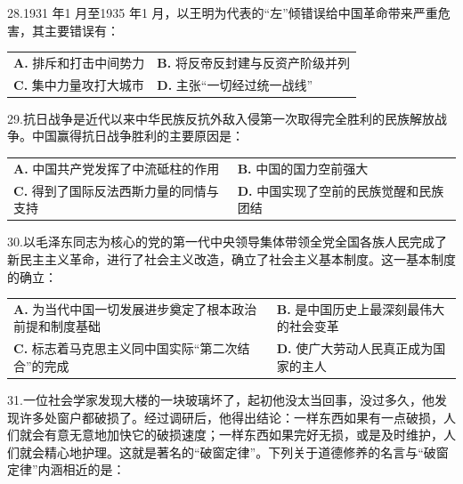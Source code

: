 \documentclass[UTF8,11pt]{ctexart}
\begin{document}
28.1931 年1 月至1935 年1 月，以王明为代表的“左”倾错误给中国革命带来严重危害，其主要错误有：


\begin{center}\begin{tabular}{>{\raggedright\arraybackslash}p{\dimexpr(\linewidth-4\tabcolsep)/2\relax}>{\raggedright\arraybackslash}p{\dimexpr(\linewidth-4\tabcolsep)/2\relax}}
\textbf{A.} 排斥和打击中间势力 & \textbf{B.} 将反帝反封建与反资产阶级并列\\[.35em]
\textbf{C.} 集中力量攻打大城市 & \textbf{D.} 主张“一切经过统一战线”\\[.35em]\end{tabular}\end{center}

29.抗日战争是近代以来中华民族反抗外敌入侵第一次取得完全胜利的民族解放战争。中国赢得抗日战争胜利的主要原因是：


\begin{center}\begin{tabular}{>{\raggedright\arraybackslash}p{\dimexpr(\linewidth-4\tabcolsep)/2\relax}>{\raggedright\arraybackslash}p{\dimexpr(\linewidth-4\tabcolsep)/2\relax}}
\textbf{A.} 中国共产党发挥了中流砥柱的作用 & \textbf{B.} 中国的国力空前强大\\[.35em]
\textbf{C.} 得到了国际反法西斯力量的同情与支持 & \textbf{D.} 中国实现了空前的民族觉醒和民族团结\\[.35em]\end{tabular}\end{center}

30.以毛泽东同志为核心的党的第一代中央领导集体带领全党全国各族人民完成了新民主主义革命，进行了社会主义改造，确立了社会主义基本制度。这一基本制度的确立：


\begin{center}\begin{tabular}{>{\raggedright\arraybackslash}p{\dimexpr(\linewidth-4\tabcolsep)/2\relax}>{\raggedright\arraybackslash}p{\dimexpr(\linewidth-4\tabcolsep)/2\relax}}
\textbf{A.} 为当代中国一切发展进步奠定了根本政治前提和制度基础 & \textbf{B.} 是中国历史上最深刻最伟大的社会变革\\[.35em]
\textbf{C.} 标志着马克思主义同中国实际“第二次结合”的完成 & \textbf{D.} 使广大劳动人民真正成为国家的主人\\[.35em]\end{tabular}\end{center}

31.一位社会学家发现大楼的一块玻璃坏了，起初他没太当回事，没过多久，他发现许多处窗户都破损了。经过调研后，他得出结论：一样东西如果有一点破损，人们就会有意无意地加快它的破损速度；一样东西如果完好无损，或是及时维护，人们就会精心地护理。这就是著名的“破窗定律”。下列关于道德修养的名言与“破窗定律”内涵相近的是：
\end{document}
